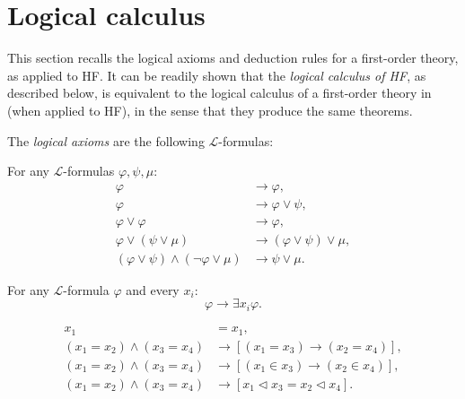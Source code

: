 \section{Logical calculus}

This section recalls the logical axioms and deduction rules for a first-order theory, 
as applied to HF. 
It can be readily shown that the \textit{logical calculus of HF}, as described below, 
is equivalent to the logical calculus of a first-order theory in \cite{shoenfield1967mathematical} 
(when applied to HF), in the sense that they produce the same theorems.

The \textit{logical axioms} are the following $\mathcal{L}$-formulas:

\begin{definition}
    \label{def:Bool.Axioms}
    \leanok
    For any $\mathcal{L}$-formulas $\varphi, \psi, \mu$:
    $$
    \begin{aligned}
    \varphi & \rightarrow \varphi, \\
    \varphi & \rightarrow \varphi \lor \psi, \\
    \varphi \lor \varphi & \rightarrow \varphi, \\
    \varphi \lor(\psi \lor \mu) & \rightarrow(\varphi \lor \psi) \lor \mu, \\
    (\varphi \lor \psi) \land(\neg \varphi \lor \mu) & \rightarrow \psi \lor \mu .
    \end{aligned}
    $$
\end{definition}

\begin{definition}
    \label{def:Spec.Axiom}
    \leanok
    For any $\mathcal{L}$-formula $\varphi$ and every $x_i$:
    $$\varphi \rightarrow \exists x_i \varphi.$$
\end{definition}

\begin{definition}
    \label{def:Equality.Axioms}
    \leanok
    $$
    \begin{aligned}
        x_1 & = x_1, \\
        \left(x_1=x_2\right) \land \left(x_3=x_4\right) & 
        \rightarrow \left[\left(x_1=x_3\right) \rightarrow \left(x_2=x_4\right)\right], \\
        \left(x_1=x_2\right) \land \left(x_3=x_4\right) & 
        \rightarrow \left[\left(x_1 \in x_3\right) \rightarrow \left(x_2 \in x_4\right)\right], \\
        \left(x_1=x_2\right) \land \left(x_3=x_4\right) & 
        \rightarrow \left[x_1 \lhd x_3 = x_2 \lhd x_4 \right]. 
    \end{aligned}
    $$
\end{definition}

